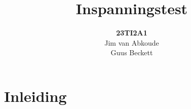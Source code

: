 \documentclass[]{article}
\begin{document}
\title{Inspanningstest}

\author{\textbf{23TI2A1}\\Jim van Abkoude\\Guus Beckett }
\maketitle
\newpage
\tableofcontents
\newpage
\section{Inleiding}
\end{document}
